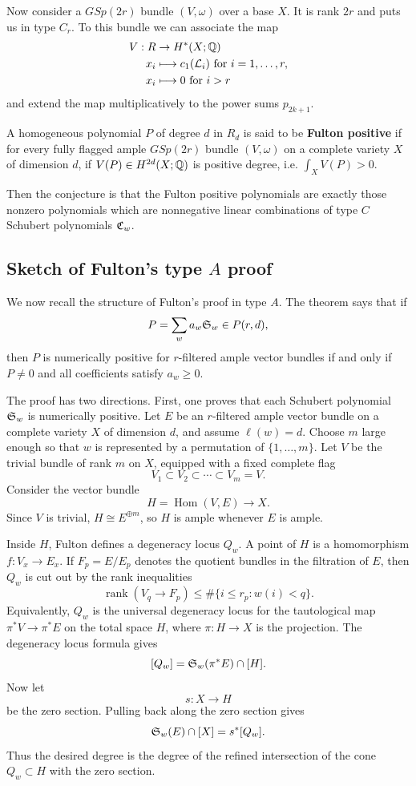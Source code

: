 \documentclass[12pt]{article}
\begin{document}
Now consider a $GSp(2r)$ bundle $(V,\omega)$ over a base $X$. It is rank $2r$ and puts us in type $C_r$. To this bundle we can associate the map \begin{align*}
    V: R & \to H^*(X;\mathbb{Q})                                           \\
    x_i  & \longmapsto c_1(\mathcal L_i) \text{ for } i=1,\dots,r, \\
    x_i  & \longmapsto 0 \text{ for } i>r
\end{align*} and extend the map multiplicatively to the power sums $p_{2k+1}$.

\begin{definition}
    A homogeneous polynomial $P$ of degree $d$ in $R_d$ is said to be \textbf{Fulton positive} if for every fully flagged ample $GSp(2r)$ bundle $(V,\omega)$ on a complete variety $X$ of dimension $d$, if $V(P) \in H^{2d}(X;\mathbb{Q})$ is positive degree, i.e. $\int_X V(P) > 0$.
\end{definition}

Then the conjecture is that the Fulton positive polynomials are exactly those nonzero polynomials which are nonnegative linear combinations of type $C$ Schubert polynomials $\mathfrak{C}_w$.

\subsection{Sketch of Fulton's type $A$ proof}

We now recall the structure of Fulton's proof in type $A$. The theorem says that if
\[
    P=\sum_w a_w\mathfrak{S}_w \in P(r,d),
\]
then $P$ is numerically positive for $r$-filtered ample vector bundles if and only if $P\ne 0$ and all coefficients satisfy $a_w\geq 0$.

The proof has two directions. First, one proves that each Schubert polynomial $\mathfrak{S}_w$ is numerically positive. Let $E$ be an $r$-filtered ample vector bundle on a complete variety $X$ of dimension $d$, and assume $\ell(w)=d$. Choose $m$ large enough so that $w$ is represented by a permutation of $\{1,\ldots,m\}$. Let $V$ be the trivial bundle of rank $m$ on $X$, equipped with a fixed complete flag
\[
    V_1\subset V_2\subset\cdots\subset V_m=V.
\]
Consider the vector bundle
\[
    H=\operatorname{Hom}(V,E)\longrightarrow X.
\]
Since $V$ is trivial, $H\cong E^{\oplus m}$, so $H$ is ample whenever $E$ is ample.

Inside $H$, Fulton defines a degeneracy locus $Q_w$. A point of $H$ is a homomorphism $f:V_x\to E_x$. If $F_p=E/E_p$ denotes the quotient bundles in the filtration of $E$, then $Q_w$ is cut out by the rank inequalities
\[
    \operatorname{rank}(V_q\to F_p)
    \leq
    \#\{i\leq r_p: w(i)<q\}.
\]
Equivalently, $Q_w$ is the universal degeneracy locus for the tautological map $\pi^*V\longrightarrow \pi^*E$ on the total space $H$, where $\pi:H\to X$ is the projection. The degeneracy locus formula gives
\[
    [Q_w]
    =
    \mathfrak{S}_w(\pi^*E)\cap [H].
\]
Now let
\[
    s:X\longrightarrow H
\]
be the zero section. Pulling back along the zero section gives
\[
    \mathfrak{S}_w(E)\cap [X]
    =
    s^*[Q_w].
\]
Thus the desired degree is the degree of the refined intersection of the cone $Q_w\subset H$ with the zero section.
\end{document}
